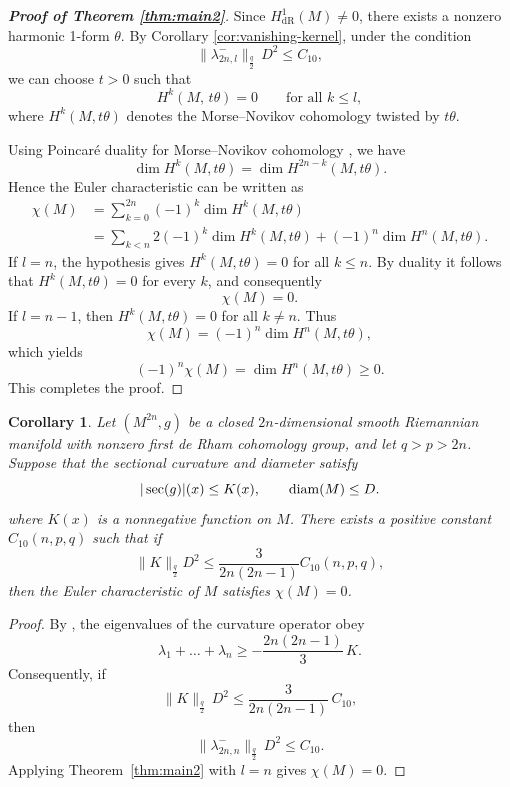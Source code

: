\documentclass[12pt, twoside]{article}
\newtheorem{corollary}[theorem]{Corollary}
\theoremstyle{definition}
\numberwithin{equation}{section}
\begin{document}
\begin{proof}[\textbf{Proof of Theorem \ref{thm:main2}}]
	Since \(H^1_{\text{dR}}(M) \neq 0\), there exists a nonzero harmonic 1-form \(\theta\).  
	By Corollary \ref{cor:vanishing-kernel}, under the condition  
	\[
	\big\|\lambda_{2n,l}^{-}\big\|_{\frac{q}{2}}\, D^{2} \le C_{10},
	\]  
	we can choose \(t>0\) such that  
	\[
	H^{k}(M,\,t\theta)=0 \qquad\text{for all }k\le l,
	\]  
	where \(H^{k}(M,t\theta)\) denotes the Morse--Novikov cohomology twisted by \(t\theta\).
	
	Using Poincaré duality for Morse--Novikov cohomology \cite{Novikov1982},  we have
	\[
	\dim H^{k}(M,t\theta)=\dim H^{2n-k}(M,t\theta).
	\]  
	Hence the Euler characteristic can be written as  
	\begin{align*}
	\chi(M) 
	&= \sum_{k=0}^{2n}(-1)^{k}\dim H^{k}(M,t\theta) \\
	&= \sum_{k<n} 2(-1)^{k}\dim H^{k}(M,t\theta)
	+ (-1)^{n}\dim H^{n}(M,t\theta).
	\end{align*}
	If \(l=n\), the hypothesis gives \(H^{k}(M,t\theta)=0\) for all \(k\le n\).  
	By duality it follows that \(H^{k}(M,t\theta)=0\) for every \(k\), and consequently  
	\[
	\chi(M)=0.
	\]
	If \(l=n-1\), then \(H^{k}(M,t\theta)=0\) for all \(k\neq n\).  
	Thus  
	\[
	\chi(M)=(-1)^{n}\dim H^{n}(M,t\theta),
	\]  
	which yields  
	\[
	(-1)^{n}\chi(M)=\dim H^{n}(M,t\theta)\ge 0.
	\]
This completes the proof.
\end{proof}
\begin{corollary}\label{cor:eigenvalue-lower-bound}
	Let \((M^{2n}, g)\) be a closed \(2n\)-dimensional smooth Riemannian manifold with nonzero first de Rham cohomology group, and let $q>p>2n$. Suppose that the sectional curvature and diameter satisfy
	\[
	|\sec(g)|(x)\leq K(x), \qquad{\rm{diam}}(M)\leq D.
	\]
	where $K(x)$ is a nonnegative function on $M$. There exists a positive constant $C_{10}(n,p,q)$ such that if 
	$$\|K\|_{\frac{q}{2}}D^{2}\leq\frac{3}{2n(2n-1)}C_{10}(n,p,q),$$
then the Euler characteristic of $M$ satisfies $\chi(M)=0$.
\end{corollary}
\begin{proof}
	By \cite[Proposition 3.8]{Bourguignon1978}, the eigenvalues of the curvature operator obey
	\[
	\lambda_{1} + \dots + \lambda_{n} \ge -\frac{2n(2n-1)}{3}\,K.
	\]
	Consequently, if 
	\[
	\|K\|_{\frac{q}{2}}\, D^{2} \le \frac{3}{2n(2n-1)}\,C_{10},
	\]
	then 
	\[
	\big\|\lambda^{-}_{2n,n}\big\|_{\frac{q}{2}}\, D^{2} \le C_{10}.
	\]
	Applying Theorem~\ref{thm:main2} with \(l = n\) gives \(\chi(M) = 0\).
\end{proof}
\end{document}
